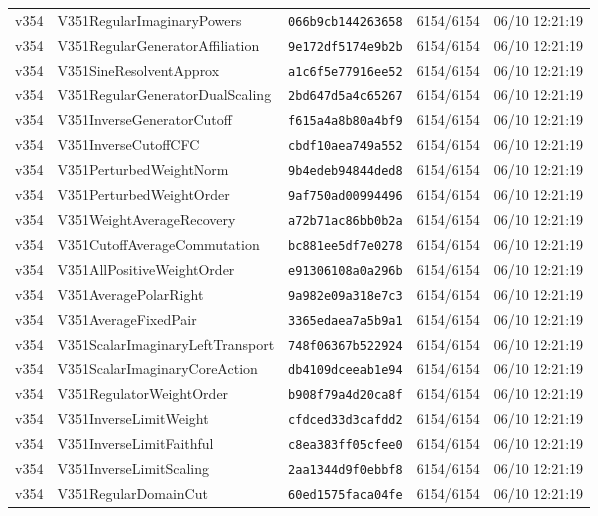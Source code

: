 \documentclass[11pt]{article}
\theoremstyle{definition}\newtheorem{deriv}{Derivation}
\begin{document}
{\begin{longtable}{@{}lllll@{}}
v354 & V351RegularImaginaryPowers & \texttt{066b9cb144263658} & 6154/6154 & 06/10 12:21:19 \\
v354 & V351RegularGeneratorAffiliation & \texttt{9e172df5174e9b2b} & 6154/6154 & 06/10 12:21:19 \\
v354 & V351SineResolventApprox & \texttt{a1c6f5e77916ee52} & 6154/6154 & 06/10 12:21:19 \\
v354 & V351RegularGeneratorDualScaling & \texttt{2bd647d5a4c65267} & 6154/6154 & 06/10 12:21:19 \\
v354 & V351InverseGeneratorCutoff & \texttt{f615a4a8b80a4bf9} & 6154/6154 & 06/10 12:21:19 \\
v354 & V351InverseCutoffCFC & \texttt{cbdf10aea749a552} & 6154/6154 & 06/10 12:21:19 \\
v354 & V351PerturbedWeightNorm & \texttt{9b4edeb94844ded8} & 6154/6154 & 06/10 12:21:19 \\
v354 & V351PerturbedWeightOrder & \texttt{9af750ad00994496} & 6154/6154 & 06/10 12:21:19 \\
v354 & V351WeightAverageRecovery & \texttt{a72b71ac86bb0b2a} & 6154/6154 & 06/10 12:21:19 \\
v354 & V351CutoffAverageCommutation & \texttt{bc881ee5df7e0278} & 6154/6154 & 06/10 12:21:19 \\
v354 & V351AllPositiveWeightOrder & \texttt{e91306108a0a296b} & 6154/6154 & 06/10 12:21:19 \\
v354 & V351AveragePolarRight & \texttt{9a982e09a318e7c3} & 6154/6154 & 06/10 12:21:19 \\
v354 & V351AverageFixedPair & \texttt{3365edaea7a5b9a1} & 6154/6154 & 06/10 12:21:19 \\
v354 & V351ScalarImaginaryLeftTransport & \texttt{748f06367b522924} & 6154/6154 & 06/10 12:21:19 \\
v354 & V351ScalarImaginaryCoreAction & \texttt{db4109dceeab1e94} & 6154/6154 & 06/10 12:21:19 \\
v354 & V351RegulatorWeightOrder & \texttt{b908f79a4d20ca8f} & 6154/6154 & 06/10 12:21:19 \\
v354 & V351InverseLimitWeight & \texttt{cfdced33d3cafdd2} & 6154/6154 & 06/10 12:21:19 \\
v354 & V351InverseLimitFaithful & \texttt{c8ea383ff05cfee0} & 6154/6154 & 06/10 12:21:19 \\
v354 & V351InverseLimitScaling & \texttt{2aa1344d9f0ebbf8} & 6154/6154 & 06/10 12:21:19 \\
v354 & V351RegularDomainCut & \texttt{60ed1575faca04fe} & 6154/6154 & 06/10 12:21:19 \\

\end{longtable}}
\end{document}
